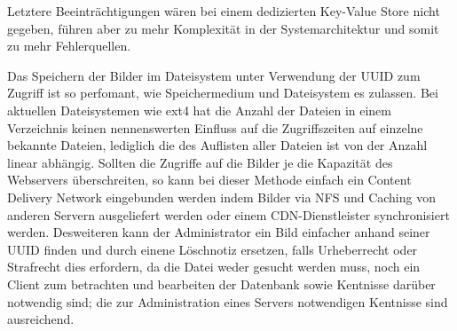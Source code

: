 Letztere Beeinträchtigungen wären bei einem dedizierten Key-Value Store nicht
gegeben, führen aber zu mehr Komplexität in der Systemarchitektur und somit zu
mehr Fehlerquellen. 

Das Speichern der Bilder im Dateisystem unter Verwendung der UUID zum Zugriff
ist so perfomant, wie Speichermedium und Dateisystem es zulassen. Bei aktuellen
Dateisystemen wie ext4 hat die Anzahl der Dateien in einem Verzeichnis keinen
nennenswerten Einfluss auf die Zugriffszeiten auf einzelne bekannte Dateien,
lediglich die des Auflisten aller Dateien ist von der Anzahl linear abhängig.
Sollten die Zugriffe auf die Bilder je die Kapazität des Webservers
überschreiten, so kann bei dieser Methode einfach ein Content Delivery Network
eingebunden werden indem Bilder via NFS und Caching von anderen Servern
ausgeliefert werden oder einem CDN-Dienstleister synchronisiert werden.
Desweiteren kann der Administrator ein Bild einfacher anhand seiner UUID finden
und durch einene Löschnotiz ersetzen, falls Urheberrecht oder Strafrecht dies
erfordern, da die Datei weder gesucht werden muss, noch ein Client zum
betrachten und bearbeiten der Datenbank sowie Kentnisse darüber notwendig sind;
die zur Administration eines Servers notwendigen Kentnisse sind ausreichend.



